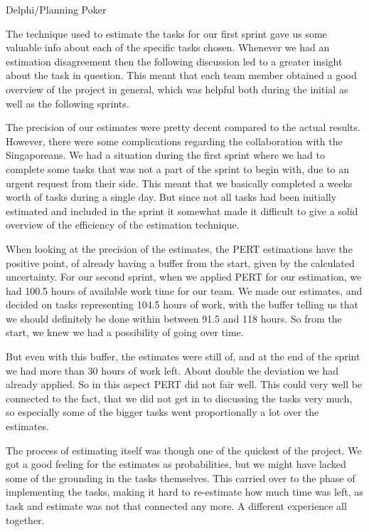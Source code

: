 Delphi/Planning Poker

The technique used to estimate the tasks for our first sprint gave us some valuable info about each of the specific tasks chosen. Whenever we had an estimation disagreement then the following discussion led to a greater insight about the task in question. This meant that each team member obtained a good overview of the project in general, which was helpful both during the initial as well as the following sprints.

The precision of our estimates were pretty decent compared to the actual results. However, there were some complications regarding the collaboration with the Singaporeans. We had a situation during the first sprint where we had to complete some tasks that was not a part of the sprint to begin with, due to an urgent request from their side. This meant that we basically completed a weeks worth of tasks during a single day. But since not all tasks had been initially estimated and included in the sprint it somewhat made it difficult to give a solid overview of the efficiency of the estimation technique. 



When looking at the precision of the estimates, the PERT estimations have the positive point, of already having a buffer from the start, given by the calculated uncertainty. For our second sprint, when we applied PERT for our estimation, we had 100.5 hours of available work time for our team. We made our estimates, and decided on tasks representing 104.5 hours of work, with the buffer telling us that we should definitely be done within between 91.5 and 118 hours. So from the start, we knew we had a possibility of going over time. \

But even with this buffer, the estimates were still of, and at the end of the sprint we had more than 30 hours of work left. About double the deviation we had already applied. So in this aspect PERT did not fair well. This could very well be connected to the fact, that we did not get in to discussing the tasks very much, so especially some of the bigger tasks went proportionally a lot over the estimates. \

The process of estimating itself was though one of the quickest of the project. We got a good feeling for the estimates as probabilities, but we might have lacked some of the grounding in the tasks themselves. This carried over to the phase of implementing the tasks, making it hard to re-estimate how much time was left, as task and estimate was not that connected any more. A different experience all together. \\


